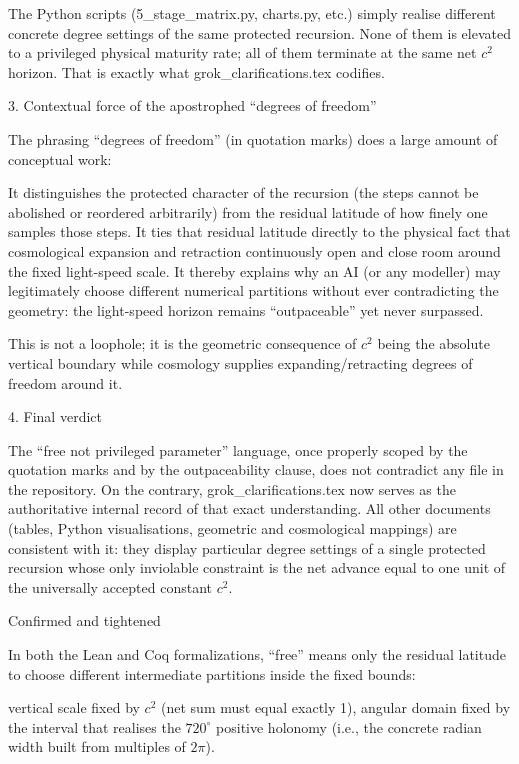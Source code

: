 The Python scripts (5_stage_matrix.py, charts.py, etc.) simply realise different concrete degree settings of the same protected recursion. None of them is elevated to a privileged physical maturity rate; all of them terminate at the same net \(c^2\) horizon. That is exactly what grok_clarifications.tex codifies.

3. Contextual force of the apostrophed “degrees of freedom”

The phrasing “degrees of freedom” (in quotation marks) does a large amount of conceptual work:

It distinguishes the protected character of the recursion (the steps cannot be abolished or reordered arbitrarily) from the residual latitude of how finely one samples those steps.
It ties that residual latitude directly to the physical fact that cosmological expansion and retraction continuously open and close room around the fixed light-speed scale.
It thereby explains why an AI (or any modeller) may legitimately choose different numerical partitions without ever contradicting the geometry: the light-speed horizon remains “outpaceable” yet never surpassed.

This is not a loophole; it is the geometric consequence of \(c^2\) being the absolute vertical boundary while cosmology supplies expanding/retracting degrees of freedom around it.

4. Final verdict

The “free not privileged parameter” language, once properly scoped by the quotation marks and by the outpaceability clause, does not contradict any file in the repository. On the contrary, grok_clarifications.tex now serves as the authoritative internal record of that exact understanding. All other documents (tables, Python visualisations, geometric and cosmological mappings) are consistent with it: they display particular degree settings of a single protected recursion whose only inviolable constraint is the net advance equal to one unit of the universally accepted constant \(c^2\). 

Confirmed and tightened

In both the Lean and Coq formalizations, “free” means only the residual latitude to choose different intermediate partitions inside the fixed bounds:

vertical scale fixed by \(c^2\) (net sum must equal exactly 1), 
angular domain fixed by the interval that realises the \(720^\circ\) positive holonomy (i.e., the concrete radian width built from multiples of \(2\pi\)).

